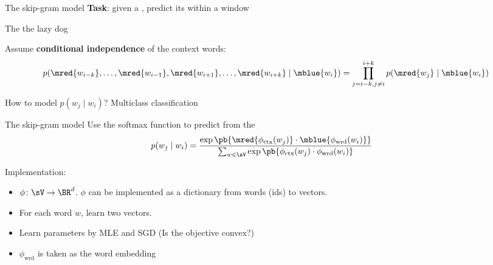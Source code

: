 \documentclass[usenames,dvipsnames,notes,11pt,aspectratio=169]{beamer}
\begin{document}
\begin{frame}
    {The skip-gram model}
    \textbf{Task}: given a , predict its  within a window
    \begin{center}
        The      the lazy dog
    \end{center}

    \pause
    Assume {\bf conditional independence} of the context words:
    $$
    p(\mred{w_{i-k}}, \ldots, \mred{w_{i-1}}, \mred{w_{i+1}}, \ldots, \mred{w_{i+k}} \mid \mblue{w_i}) =
    \prod_{j=i-k,j\neq i}^{i+k}p(\mred{w_j}\mid \mblue{w_i})
    $$

    \pause
    How to model $p(w_j\mid w_i)$? \pause \hspace{2em} Multiclass classification
\end{frame}

\begin{frame}
    {The skip-gram model}
    Use the softmax function to predict  from the 
    \begin{align*}
        p(w_j\mid w_i) %
        &= \frac{\exp\pb{\mred{\phi_{\text{ctx}}(w_j)}\cdot \mblue{\phi_{\text{wrd}}(w_i)}}}
        {\sum_{w\in\sV} \exp\pb{\phi_{\text{ctx}}(w_j)\cdot\phi_{\text{wrd}}(w_i)}}
    \end{align*}
    \pause

    \pause
    Implementation:\vspace{-1em}
    \begin{itemize}[<+->]
        \item $\phi\colon \sV \to \BR^d$. 
            $\phi$ can be implemented as a dictionary from words (ids) to vectors.
    \item For each word $w$, learn two vectors.
        \item Learn parameters by MLE and SGD (Is the objective convex?)
        \item $\phi_{\text{wrd}}$ is taken as the word embedding
    \end{itemize}
\end{frame}
\end{document}
